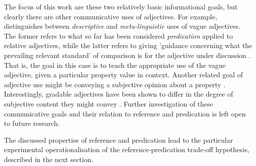 The focus of this work are these two relatively basic informational goals, but clearly there are other communicative uses of adjectives. For example, \textcite{barker2002dynamics} distinguishes between \textit{descriptive} and \textit{meta-linguistic} uses of vague adjectives. The former refers to what so far has been considered \emph{predication} applied to relative adjectives, while the latter refers to giving 'guidance concerning what the prevailing relevant standard' of comparison is for the adjective under discussion \parencite[p. 2]{barker2002dynamics}. That is, the goal in this case is to teach the appropriate use of the vague adjective, given a particular property value in context. Another related goal of adjective use might be conveying a subjective opinion about a property \parencite{kaiser2020}. Interestingly, gradable adjectives have been shown to differ in the degree of subjective content they might convey \parencite{scontras2017subjectivity}. Further investigation of these communicative goals and their relation to reference and predication is left open to future research.

The discussed properties of reference and predication lead to the particular experimental operationalisation of the reference-predication trade-off hypothesis, described in the next section. 

